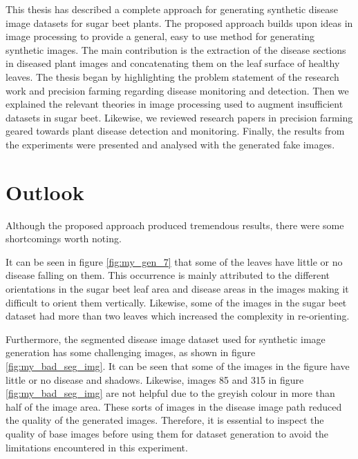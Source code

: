 This thesis has described a complete approach for generating synthetic disease image datasets for sugar beet plants. The proposed approach builds upon ideas in image processing to provide a general, easy to use method for generating synthetic images. The main contribution is the extraction of the disease sections in diseased plant images and concatenating them on the leaf surface of healthy leaves. The thesis began by highlighting the problem statement of the research work and precision farming regarding disease monitoring and detection. Then we explained the relevant theories in image processing used to augment insufficient datasets in sugar beet. Likewise, we reviewed research papers in precision farming geared towards plant disease detection and monitoring. Finally, the results from the experiments were presented and analysed with the generated fake images.

\section{Outlook}\label{sec:outlook}

Although the proposed approach produced tremendous results, there were some shortcomings worth noting.

It can be seen in figure \ref{fig:my_gen_7} that some of the leaves have little or no disease falling on them. This occurrence is mainly attributed to the different orientations in the sugar beet leaf area and disease areas in the images making it difficult to orient them vertically. Likewise, some of the images in the sugar beet dataset had more than two leaves which increased the complexity in re-orienting.

Furthermore, the segmented disease image dataset used for synthetic image generation has some challenging images, as shown in figure \ref{fig:my_bad_seg_img}. It can be seen that some of the images in the figure have little or no disease and shadows. Likewise, images 85 and 315 in figure \ref{fig:my_bad_seg_img} are not helpful due to the greyish colour in more than half of the image area. These sorts of images in the disease image path reduced the quality of the generated images. Therefore, it is essential to inspect the quality of base images before using them for dataset generation to avoid the limitations encountered in this experiment.


